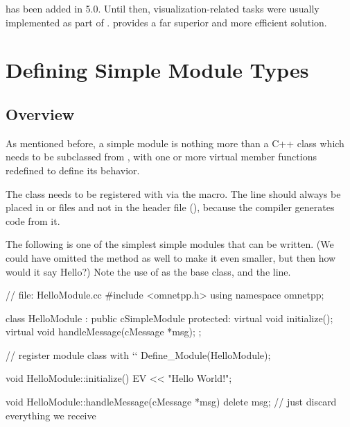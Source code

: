 \begin{note}
     has been added in {\opp} 5.0. Until then,
    visualization-related tasks were usually implemented as part of
    .  provides
    a far superior and more efficient solution.
\end{note}


\section{Defining Simple Module Types}
\label{sec:simple-modules:defining-simple-modules}

\subsection{Overview}
\label{sec:simple-modules:defining:overview}

As mentioned before, a simple module is nothing more
than a C++ class which needs to be subclassed from ,
with one or more virtual member functions redefined to define its behavior.

The class needs to be registered with {\opp} via the  macro.
The  line should always be placed in  or 
files and not in the header file (), because the compiler generates code from it.

The following  is one of the simplest simple modules that can be written.
(We could have omitted the  method as well to make it even smaller,
but then how would it say Hello?) Note the use of  as the base class,
and the  line.

\begin{cpp}
// file: HelloModule.cc
#include <omnetpp.h>
using namespace omnetpp;

class HelloModule : public cSimpleModule
{
  protected:
    virtual void initialize();
    virtual void handleMessage(cMessage *msg);
};

// register module class with `\opp`
Define_Module(HelloModule);

void HelloModule::initialize()
{
    EV << "Hello World!\n";
}

void HelloModule::handleMessage(cMessage *msg)
{
    delete msg; // just discard everything we receive
}
\end{cpp}

